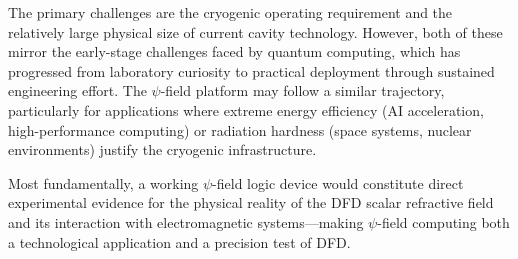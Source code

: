 \documentclass[12pt,a4paper,twoside]{article}
\begin{document}
The primary challenges are the cryogenic operating requirement and the relatively large physical size of current cavity technology. However, both of these mirror the early-stage challenges faced by quantum computing, which has progressed from laboratory curiosity to practical deployment through sustained engineering effort. The $\psi$-field platform may follow a similar trajectory, particularly for applications where extreme energy efficiency (AI acceleration, high-performance computing) or radiation hardness (space systems, nuclear environments) justify the cryogenic infrastructure.

Most fundamentally, a working $\psi$-field logic device would constitute direct experimental evidence for the physical reality of the DFD scalar refractive field and its interaction with electromagnetic systems---making $\psi$-field computing both a technological application and a precision test of DFD.
\end{document}
